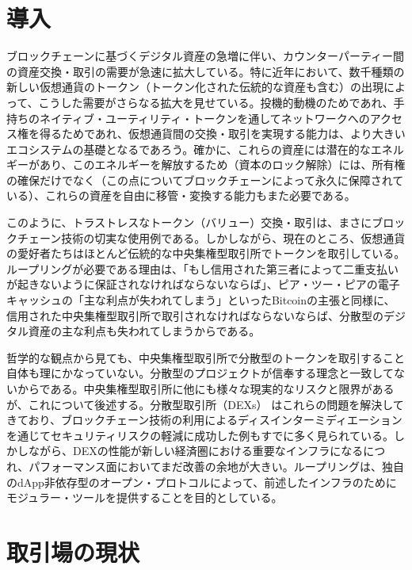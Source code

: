 \documentclass{article}
\begin{document}
\begin{multicols}{2}
\section{導入\label{sec:introduction}}
ブロックチェーンに基づくデジタル資産の急増に伴い、カウンターパーティー間の資産交換・取引の需要が急速に拡大している。特に近年において、数千種類の新しい仮想通貨のトークン（トークン化された伝統的な資産も含む）の出現によって、こうした需要がさらなる拡大を見せている。投機的動機のためであれ、手持ちのネイティブ・ユーティリティ・トークンを通してネットワークへのアクセス権を得るためであれ、仮想通貨間の交換・取引を実現する能力は、より大きいエコシステムの基礎となるであろう。確かに、これらの資産には潜在的なエネルギーがあり\cite{desotocapital}、このエネルギーを解放するため（資本のロック解除）には、所有権の確保だけでなく（この点についてブロックチェーンによって永久に保障されている）、これらの資産を自由に移管・変換する能力もまた必要である。

このように、トラストレスなトークン（バリュー）交換・取引は、まさにブロックチェーン技術の切実な使用例である。しかしながら、現在のところ、仮想通貨の愛好者たちはほとんど伝統的な中央集権型取引所でトークンを取引している。ループリングが必要である理由は、「もし信用された第三者によって二重支払いが起きないように保証されなければならないならば」、ピア・ツー・ピアの電子キャッシュの「主な利点が失われてしまう」といったBitcoin\cite{desotocapital}の主張と同様に、信用された中央集権型取引所で取引されなければならないならば、分散型のデジタル資産の主な利点も失われてしまうからである。

哲学的な観点から見ても、中央集権型取引所で分散型のトークンを取引すること自体も理にかなっていない。分散型のプロジェクトが信奉する理念と一致してないからである。中央集権型取引所に他にも様々な現実的なリスクと限界があるが、これについて後述する。分散型取引所（DEXs） \cite{schuh2015bitshares} \cite{bancor} \cite{kyber}はこれらの問題を解決してきており、ブロックチェーン技術の利用によるディスインターミディエーションを通じてセキュリティリスクの軽減に成功した例もすでに多く見られている。しかしながら、DEXの性能が新しい経済圏における重要なインフラになるにつれ、パフォーマンス面においてまだ改善の余地が大きい。ループリングは、独自のdApp非依存型のオープン・プロトコルによって、前述したインフラのためにモジュラー・ツールを提供することを目的としている。


\section{取引場の現状\label{sec:current_exchange_landscape}}


\end{multicols}
\end{document}
